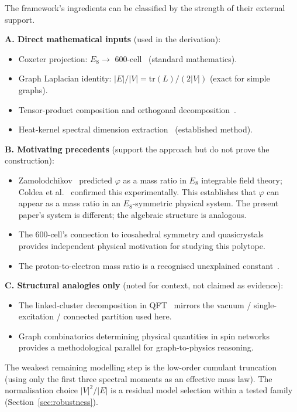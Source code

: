 \documentclass[12pt]{article}
\newcommand{\phig}{\varphi}
\begin{document}
The framework's ingredients can be classified by the strength of their external support.

\textbf{A. Direct mathematical inputs} (used in the derivation):
\begin{itemize}
    \item Coxeter projection: $E_8 \to$ 600-cell~\citep{Coxeter1973} (standard mathematics).
    \item Graph Laplacian identity: $|E|/|V| = \mathrm{tr}(L)/(2|V|)$ (exact for simple graphs).
    \item Tensor-product composition and orthogonal decomposition~\citep{NielsenChuang2000, ReedSimon1978}.
    \item Heat-kernel spectral dimension extraction~\citep{Ambjorn2005} (established method).
\end{itemize}

\textbf{B. Motivating precedents} (support the approach but do not prove the construction):
\begin{itemize}
    \item Zamolodchikov~\citep{Zamolodchikov1989} predicted $\phig$ as a mass ratio in $E_8$ integrable field theory; Coldea et al.~\citep{Coldea2010} confirmed this experimentally. This establishes that $\phig$ can appear as a mass ratio in an $E_8$-symmetric physical system. The present paper's system is different; the algebraic structure is analogous.
    \item The 600-cell's connection to icosahedral symmetry and quasicrystals~\citep{Shechtman1984} provides independent physical motivation for studying this polytope.
    \item The proton-to-electron mass ratio is a recognised unexplained constant~\citep{Uzan2003}.
\end{itemize}

\textbf{C. Structural analogies only} (noted for context, not claimed as evidence):
\begin{itemize}
    \item The linked-cluster decomposition in QFT~\citep{Weinberg1995} mirrors the vacuum / single-excitation / connected partition used here.
    \item Graph combinatorics determining physical quantities in spin networks~\citep{Penrose1971} provides a methodological parallel for graph-to-physics reasoning.
\end{itemize}

The weakest remaining modelling step is the low-order cumulant truncation (using only the first three spectral moments as an effective mass law). The normalisation choice $|V|^2/|E|$ is a residual model selection within a tested family (Section~\ref{sec:robustness}).
\end{document}
